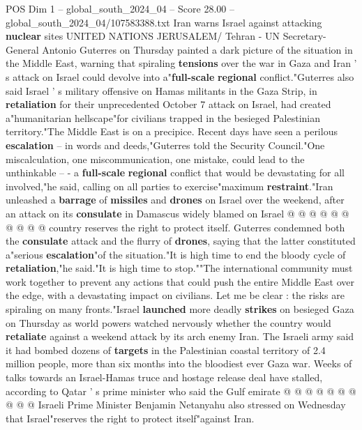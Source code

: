 \begin{textsample}{POS Dim 1 – global\_south\_2024\_04 – Score 28.00 – global\_south\_2024\_04/107583388.txt}  \label{ex:f1_pos_044}
Iran warns Israel against attacking \textbf{nuclear} sites UNITED NATIONS JERUSALEM/ Tehran - UN Secretary-General Antonio Guterres on Thursday painted a dark picture of the situation in the Middle East, warning that spiraling \textbf{tensions} over the war in Gaza and Iran ' s attack on Israel could devolve into a"\textbf{full-scale} \textbf{regional} conflict."Guterres also said Israel ' s military offensive on Hamas militants in the Gaza Strip, in \textbf{retaliation} for their unprecedented October 7 attack on Israel, had created a"humanitarian hellscape"for civilians trapped in the besieged Palestinian territory."The Middle East is on a precipice.
Recent days have seen a perilous \textbf{escalation} -- in words and deeds,"Guterres told the Security Council."One miscalculation, one miscommunication, one mistake, could lead to the unthinkable -- - a \textbf{full-scale} \textbf{regional} conflict that would be devastating for all involved,"he said, calling on all parties to exercise"maximum \textbf{restraint}."Iran unleashed a \textbf{barrage} of \textbf{missiles} and \textbf{drones} on Israel over the weekend, after an attack on its \textbf{consulate} in Damascus widely blamed on Israel @ @ @ @ @ @ @ @ @ @ country reserves the right to protect itself.
Guterres condemned both the \textbf{consulate} attack and the flurry of \textbf{drones}, saying that the latter constituted a"serious \textbf{escalation}"of the situation."It is high time to end the bloody cycle of \textbf{retaliation},"he said."It is high time to stop.""The international community must work together to prevent any actions that could push the entire Middle East over the edge, with a devastating impact on civilians.
Let me be clear : the risks are spiraling on many fronts."Israel \textbf{launched} more deadly \textbf{strikes} on besieged Gaza on Thursday as world powers watched nervously whether the country would \textbf{retaliate} against a weekend attack by its arch enemy Iran.
The Israeli army said it had bombed dozens of \textbf{targets} in the Palestinian coastal territory of 2.4 million people, more than six months into the bloodiest ever Gaza war.
Weeks of talks towards an Israel-Hamas truce and hostage release deal have stalled, according to Qatar ' s prime minister who said the Gulf emirate @ @ @ @ @ @ @ @ @ @ Israeli Prime Minister Benjamin Netanyahu also stressed on Wednesday that Israel"reserves the right to protect itself"against Iran.

\end{textsample}
